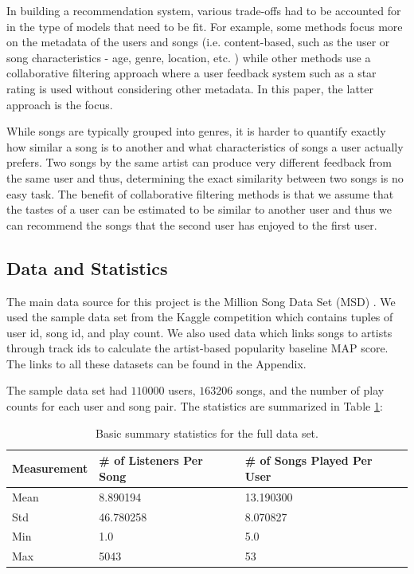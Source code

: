 \documentclass[11pt,preprint]{aastex}
\begin{document}
In building a recommendation system, various trade-offs had to be accounted for in the type of models that need to be fit. For example, some methods focus more on the metadata of the users and songs (i.e. content-based, such as the user or song characteristics - age, genre, location, etc. ) while other methods use a collaborative filtering approach where a user feedback system such as a star rating is used without considering other metadata. In this paper, the latter approach is the focus.

While songs are typically grouped into genres, it is harder to quantify exactly how similar a song is to another and what characteristics of songs a user actually prefers. Two songs by the same artist can produce very different feedback from the same user and thus, determining the exact similarity between two songs is no easy task. The benefit of collaborative filtering methods is that we assume that the tastes of a user can be estimated to be similar to another user and thus we can recommend the songs that the second user has enjoyed to the first user.

\subsection{Data and Statistics}
The main data source for this project is the Million Song Data Set (MSD)  \citep{Bertin-Mahieux2011}. We used the sample data set from the Kaggle competition which contains tuples of user id, song id, and play count. We also used data which links songs to artists through track ids to calculate the artist-based popularity baseline MAP score. The links to all these datasets can be found in the Appendix.

The sample data set had $110000$ users, $163206$ songs, and the number of play counts for each user and song pair. The statistics are summarized in Table \ref{tab:stats}:

\begin{table}[h]
\begin{center}
\begin{tabular}{lll}
\hline
Measurement & \# of Listeners Per Song & \# of Songs Played Per User \\
\hline
Mean  &     8.890194 & 13.190300  \\
Std      &    46.780258 & 8.070827 \\
Min      &    1.0  & 5.0  \\
Max     &   5043 &  53 \\
\end{tabular}
\caption{Basic summary statistics for the full data set.}\label{tab:stats}
\end{center}
\end{table}
\end{document}
